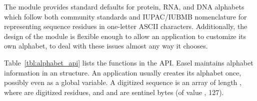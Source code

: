 The  module provides standard defaults for protein,
RNA, and DNA alphabets which follow both community standards and
IUPAC/IUBMB nomenclature for representing sequence residues in
one-letter ASCII characters. Additionally, the design of the
 module is flexible enough to allow an application to
customize its own alphabet, to deal with these issues almost any way
it chooses.

Table~\ref{tbl:alphabet_api} lists the functions in the
 API.  Easel maintains alphabet information in an
 structure. An application usually creates its
alphabet once, possibly even as a global variable.  A digitized
sequence  is an  array of length
, where  are digitized residues, and
 and  are sentinel bytes (of value
, 127).

